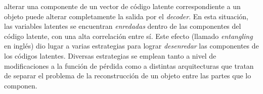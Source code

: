 \documentclass[12pt, spanish]{article}
\begin{document}
alterar una componente de un vector de código latente correspondiente
a un objeto puede alterar completamente la salida por el \textit{decoder}.
En esta situación, las variables latentes se encuentran \textit{enredadas}
dentro de las componentes del código latente, con una alta correlación entre
sí. Este efecto (llamado \textit{entangling} en inglés) dio lugar a varias
estrategias para lograr \textit{desenredar} las componentes de los códigos
latentes. Diversas estrategias se emplean tanto a nivel de modificaciones
a la función de pérdida \cite{Higgins2017} como a distintas arquitecturas
que tratan de separar el problema de la reconstrucción de un objeto entre
las partes que lo componen.

\end{document}
